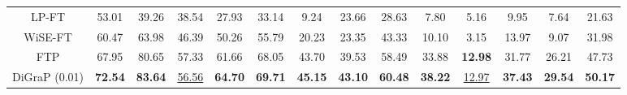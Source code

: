 \begin{table}[!h]
{\begin{tabular}{@{}c|cccccccc|cccc|c@{}}

        LP-FT &
          \multicolumn{1}{c|}{53.01}  &
          39.26 &
          \multicolumn{1}{c|}{38.54} &
          \multicolumn{1}{c|}{27.93} &
          \multicolumn{1}{c|}{33.14} &
          \multicolumn{1}{c|}{9.24} &
          \multicolumn{1}{c|}{23.66} &
          28.63 &
          7.80 &
          5.16 &
          \multicolumn{1}{c|}{9.95}  &
          \multicolumn{1}{c|}{7.64} &
          21.63
          \\

        WiSE-FT &
          \multicolumn{1}{c|}{60.47} &
          63.98 &
          \multicolumn{1}{c|}{46.39} &
          \multicolumn{1}{c|}{50.26} &
          \multicolumn{1}{c|}{55.79} &
          \multicolumn{1}{c|}{20.23} &
          \multicolumn{1}{c|}{23.35} &
          43.33 &
          10.10 &
          3.15 &
          \multicolumn{1}{c|}{13.97}  &
          \multicolumn{1}{c|}{9.07} &
          31.98
          \\

        FTP &
          \multicolumn{1}{c|}{67.95} &
          80.65 &
          \multicolumn{1}{c|}{57.33} &
          \multicolumn{1}{c|}{61.66} &
          \multicolumn{1}{c|}{68.05} &
          \multicolumn{1}{c|}{43.70} &
          \multicolumn{1}{c|}{39.53} &
          58.49 &
          33.88 &
          \textbf{12.98} &
          \multicolumn{1}{c|}{31.77}  &
          \multicolumn{1}{c|}{26.21} &
          47.73
          \\

        DiGraP (0.01)  &
          \multicolumn{1}{c|}{\textbf{72.54}} &
           \textbf{83.64} &
          \multicolumn{1}{c|}{\underline{56.56}} &
          \multicolumn{1}{c|}{\textbf{64.70}} &
          \multicolumn{1}{c|}{\textbf{69.71}} &
          \multicolumn{1}{c|}{\textbf{45.15}} &
          \multicolumn{1}{c|}{\textbf{43.10}} &
          \textbf{60.48} &
          \textbf{38.22} &
          \underline{12.97} &
          \multicolumn{1}{c|}{\textbf{37.43}}  &
          \multicolumn{1}{c|}{\textbf{29.54}} &
          \textbf{50.17}
          \\
        

\end{tabular}}
\end{table}
